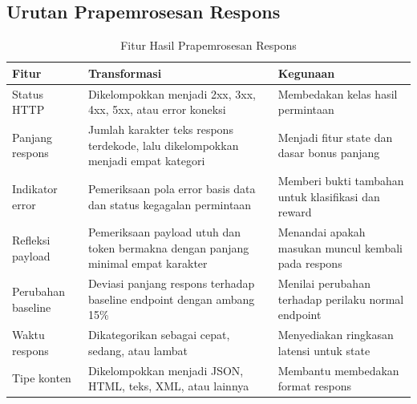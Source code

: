 \begin{enumerate}
\subsection{Urutan Prapemrosesan Respons}

\begin{table}[H]
\label{tab:fitur_prapemrosesan}
\begin{tabular}{|p{3.2cm}|p{4.1cm}|p{6.2cm}|}
\hline
\textbf{Fitur} & \textbf{Transformasi} & \textbf{Kegunaan} \\
\hline
Status HTTP & Dikelompokkan menjadi 2xx, 3xx, 4xx, 5xx, atau error koneksi & Membedakan kelas hasil permintaan \\
\hline
Panjang respons & Jumlah karakter teks respons terdekode, lalu dikelompokkan menjadi empat kategori & Menjadi fitur state dan dasar bonus panjang \\
\hline
Indikator error & Pemeriksaan pola error basis data dan status kegagalan permintaan & Memberi bukti tambahan untuk klasifikasi dan reward \\
\hline
Refleksi payload & Pemeriksaan payload utuh dan token bermakna dengan panjang minimal empat karakter & Menandai apakah masukan muncul kembali pada respons \\
\hline
Perubahan baseline & Deviasi panjang respons terhadap baseline endpoint dengan ambang 15\% & Menilai perubahan terhadap perilaku normal endpoint \\
\hline
Waktu respons & Dikategorikan sebagai cepat, sedang, atau lambat & Menyediakan ringkasan latensi untuk state \\
\hline
Tipe konten & Dikelompokkan menjadi JSON, HTML, teks, XML, atau lainnya & Membantu membedakan format respons \\
\hline
\end{tabular}
\centering
\caption{Fitur Hasil Prapemrosesan Respons}
\end{table}




\end{enumerate}
